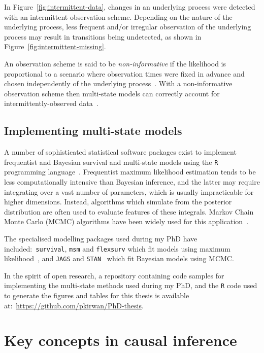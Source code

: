 In Figure~\ref{fig:intermittent-data}, changes in an underlying process were detected with an intermittent observation scheme. Depending on the nature of the underlying process, less frequent and/or irregular observation of the underlying process may result in transitions being undetected, as shown in Figure~\ref{fig:intermittent-missing}.



An observation scheme is said to be \textit{non-informative} if the likelihood is proportional to a scenario where observation times were fixed in advance and chosen independently of the underlying process~\parencite{Gruger1991-pe}. With a non-informative observation scheme then multi-state models can correctly account for intermittently-observed data~\parencite{van-den-Hout2016-xy}.

\subsection{Implementing multi-state models}

A number of sophisticated statistical software packages exist to implement frequentist and Bayesian survival and multi-state models using the \texttt{R} programming language~\parencite{R_Core_Team2020-ca}. Frequentist maximum likelihood estimation tends to be less computationally intensive than Bayesian inference, and the latter may require integrating over a vast number of parameters, which is usually impracticable for higher dimensions. Instead, algorithms which simulate from the posterior distribution are often used to evaluate features of these integrals. Markov Chain Monte Carlo (MCMC) algorithms have been widely used for this application~\parencite{Young2005-vx}.

The specialised modelling packages used during my PhD have included:\ \texttt{survival}, \texttt{msm} and \texttt{flexsurv} which fit models using maximum likelihood~\parencite{Therneau1999-to, Jackson2011-ry, Jackson2016-tv}, and \texttt{JAGS} and \texttt{STAN}~\parencite{Plummer2003-yj, Carpenter2017-wk} which fit Bayesian models using MCMC\@.

In the spirit of open research, a repository containing code samples for implementing the multi-state methods used during my PhD, and the \texttt{R} code used to generate the figures and tables for this thesis is available at:~\url{https://github.com/pkirwan/PhD-thesis}.

\section{Key concepts in causal inference}\label{sec:causal-inference}

